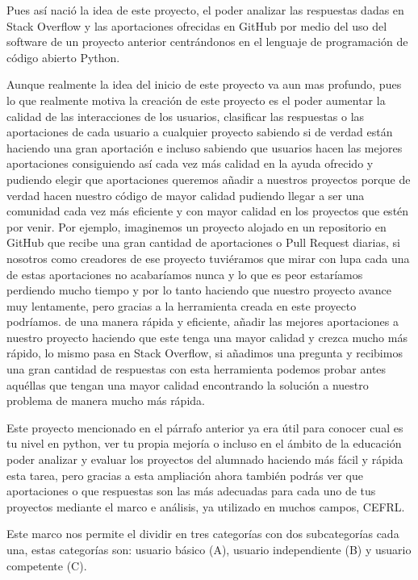 \documentclass[a4paper, 12pt]{book}
\begin{document}
Pues así nació la idea de este proyecto, el poder analizar las respuestas dadas en Stack Overflow y las aportaciones ofrecidas en GitHub por medio del uso del software de un proyecto anterior centrándonos en el lenguaje de programación de código abierto Python.

Aunque realmente la idea del inicio de este proyecto va aun mas profundo, pues lo que realmente motiva la creación de este proyecto es el poder aumentar la calidad de las interacciones de los usuarios, clasificar las respuestas o las aportaciones de cada usuario a cualquier proyecto sabiendo si de verdad están haciendo una gran aportación e incluso sabiendo que usuarios hacen las mejores aportaciones consiguiendo así cada vez más calidad en la ayuda ofrecido y pudiendo elegir que aportaciones queremos añadir a nuestros proyectos porque de verdad hacen nuestro código de mayor calidad pudiendo llegar a ser una comunidad cada vez más eficiente y con mayor calidad en los proyectos que estén por venir. Por ejemplo, imaginemos un proyecto alojado en un repositorio en GitHub que recibe una gran cantidad de aportaciones o Pull Request diarias, si nosotros como creadores de ese proyecto tuviéramos que mirar con lupa cada una de estas aportaciones no acabaríamos nunca y lo que es peor estaríamos perdiendo mucho tiempo y por lo tanto haciendo que nuestro proyecto avance muy lentamente, pero gracias a la herramienta creada en este proyecto podríamos. de una manera rápida y eficiente, añadir las mejores aportaciones a nuestro proyecto haciendo que este tenga una mayor calidad y crezca mucho más rápido, lo mismo pasa en Stack Overflow, si añadimos una pregunta y recibimos una gran cantidad de respuestas con esta herramienta podemos probar antes aquéllas que tengan una mayor calidad encontrando la solución a nuestro problema de manera mucho más rápida.

Este proyecto mencionado en el párrafo anterior ya era útil para conocer cual es tu nivel en python, ver tu propia mejoría o incluso en el ámbito de la educación poder analizar y evaluar los proyectos del alumnado haciendo más fácil y rápida esta tarea, pero gracias a esta ampliación ahora también podrás ver que aportaciones o que respuestas son las más adecuadas para cada uno de tus proyectos mediante el marco e análisis, ya utilizado en muchos campos, CEFRL.

Este marco nos permite el dividir en tres categorías con dos subcategorías cada una, estas categorías son: usuario básico (A), usuario independiente (B) y usuario competente (C).
\end{document}

